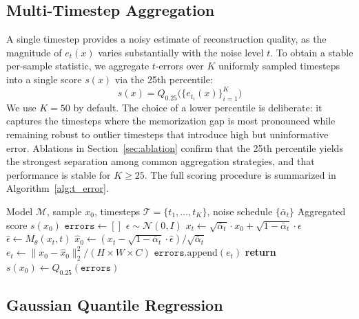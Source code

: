 \documentclass{article}
\begin{document}
\subsection{Multi-Timestep Aggregation}
\label{sec:aggregation}

A single timestep provides a noisy estimate of reconstruction quality, as the magnitude of $e_t(x)$ varies substantially with the noise level $t$. To obtain a stable per-sample statistic, we aggregate $t$-errors over $K$ uniformly sampled timesteps into a single score $s(x)$ via the 25th percentile:
\begin{equation}
  s(x) = Q_{0.25}\!\bigl(\{e_{t_i}(x)\}_{i=1}^{K}\bigr)
\end{equation}
We use $K{=}50$ by default. The choice of a lower percentile is deliberate: it captures the timesteps where the memorization gap is most pronounced while remaining robust to outlier timesteps that introduce high but uninformative error. Ablations in Section~\ref{sec:ablation} confirm that the 25th percentile yields the strongest separation among common aggregation strategies, and that performance is stable for $K \geq 25$. The full scoring procedure is summarized in Algorithm~\ref{alg:t_error}.

\begin{algorithm}[t]
\caption{$t$-error Computation}
\label{alg:t_error}
\begin{algorithmic}
\REQUIRE Model $\mathcal{M}$, sample $x_0$, timesteps $\mathcal{T} = \{t_1, \ldots, t_K\}$, noise schedule $\{\bar{\alpha}_t\}$
\ENSURE Aggregated score $s(x_0)$
\STATE $\texttt{errors} \leftarrow []$
    \STATE $\epsilon \sim \mathcal{N}(0, I)$
    \STATE $x_t \leftarrow \sqrt{\bar{\alpha}_t} \cdot x_0 + \sqrt{1 - \bar{\alpha}_t} \cdot \epsilon$
    \STATE $\hat{\epsilon} \leftarrow M_\theta(x_t, t)$
    \STATE $\hat{x}_0 \leftarrow (x_t - \sqrt{1 - \bar{\alpha}_t} \cdot \hat{\epsilon}) / \sqrt{\bar{\alpha}_t}$
    \STATE $e_t \leftarrow \|x_0 - \hat{x}_0\|_2^2 / (H \times W \times C)$
    \STATE $\texttt{errors}.\text{append}(e_t)$
\ENDFOR
\STATE \textbf{return} $s(x_0) \leftarrow Q_{0.25}(\texttt{errors})$
\end{algorithmic}
\end{algorithm}

\subsection{Gaussian Quantile Regression}
\label{sec:gaussian_qr}
\end{document}
